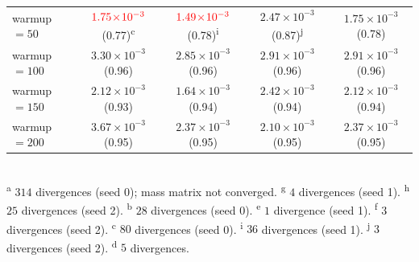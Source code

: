 \documentclass{article}
\begin{document}
\begin{table}[h]
\begin{tabular}{l c c c c}
\quad warmup $=50$  & $\textcolor{red}{1.75\!\times\!10^{-3}}$ (0.77)\textsuperscript{c} & $\textcolor{red}{1.49\!\times\!10^{-3}}$ (0.78)\textsuperscript{i} & $2.47\!\times\!10^{-3}$ (0.87)\textsuperscript{j} & $1.75\!\times\!10^{-3}$ (0.78) \\
\quad warmup $=100$ & $3.30\!\times\!10^{-3}$ (0.96) & $2.85\!\times\!10^{-3}$ (0.96) & $2.91\!\times\!10^{-3}$ (0.96) & $2.91\!\times\!10^{-3}$ (0.96) \\
\quad warmup $=150$ & $2.12\!\times\!10^{-3}$ (0.93) & $1.64\!\times\!10^{-3}$ (0.94) & $2.42\!\times\!10^{-3}$ (0.94) & $2.12\!\times\!10^{-3}$ (0.94) \\
\quad warmup $=200$ & $3.67\!\times\!10^{-3}$ (0.95) & $2.37\!\times\!10^{-3}$ (0.95) & $2.10\!\times\!10^{-3}$ (0.95) & $2.37\!\times\!10^{-3}$ (0.95) \\
\bottomrule
\end{tabular}
\\[2pt]
\footnotesize
\textsuperscript{a} $314$ divergences (seed 0); mass matrix not converged.
\textsuperscript{g} $4$ divergences (seed 1).
\textsuperscript{h} $25$ divergences (seed 2).
\textsuperscript{b} $28$ divergences (seed 0).
\textsuperscript{e} $1$ divergence (seed 1).
\textsuperscript{f} $3$ divergences (seed 2).
\textsuperscript{c} $80$ divergences (seed 0). \textsuperscript{i} $36$ divergences (seed 1). \textsuperscript{j} $3$ divergences (seed 2).
\textsuperscript{d} $5$ divergences.
\end{table}
\end{document}
